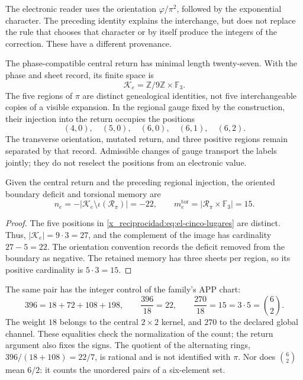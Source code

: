 The electronic reader uses the orientation \(\varphi/\pi^2\),
followed by the exponential character. The preceding identity explains the
interchange, but does not replace the rule that chooses that character or
by itself produce the integers of the correction. These have a different provenance.

The phase-compatible central return has minimal length
twenty-seven. With the phase and sheet record, its finite space is
\[
 \mathcal K_e=\mathbb Z/9\mathbb Z\times\mathbb F_3.
\]
The five regions of \(\pi\) are distinct genealogical identities,
not five interchangeable copies of a visible expansion. In the regional
gauge fixed by the construction, their injection into the return occupies
the positions
\begin{equation}
 (4,0),\quad(5,0),\quad(6,0),\quad(6,1),\quad(6,2).
 \label{x_reciprocidad:eq:el-cinco-lugares}
\end{equation}
The transverse orientation, mutated return, and three positive
regions remain separated by that record. Admissible changes
of gauge transport the labels jointly; they do not reselect
the positions from an electronic value.

\begin{proposition}
Given the central return and the preceding regional injection, the oriented
boundary deficit and torsional memory are
\begin{equation}
 n_e=-|\mathcal K_e\setminus\iota(\mathscr R_\pi)|=-22,
 \qquad
 m_e^{\mathrm{tor}}=|\mathscr R_\pi\times\mathbb F_3|=15.
 \label{x_reciprocidad:eq:el-selector-enteros}
\end{equation}
\end{proposition}
\begin{proof}
The five positions in \eqref{x_reciprocidad:eq:el-cinco-lugares} are distinct.
Thus, \(|\mathcal K_e|=9\cdot3=27\), and the complement of the image
has cardinality \(27-5=22\). The orientation convention records
the deficit removed from the boundary as negative. The retained memory has
three sheets per region, so its positive cardinality is
\(5\cdot3=15\).
\end{proof}

The same pair has the integer control of the family's APP chart:
\begin{equation}
 396=18+72+108+198,
 \qquad \frac{396}{18}=22,
 \qquad \frac{270}{18}=15=3\cdot5=\binom62.
 \label{x_reciprocidad:eq:el-censo}
\end{equation}
The weight \(18\) belongs to the central \(2\times2\) kernel, and \(270\)
to the declared global channel. These equalities check the normalization
of the count; the return argument also fixes the signs. The
quotient of the alternating rings,
\(396/(18+108)=22/7\), is rational and is not identified with \(\pi\).
Nor does \(\binom62\) mean \(6/2\): it counts the unordered pairs
of a six-element set.

